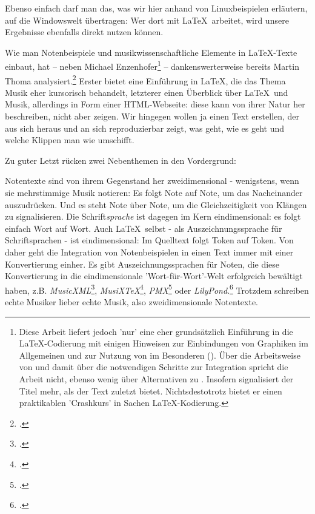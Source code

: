 Ebenso einfach darf man das, was wir hier anhand von Linuxbeispielen erläutern,
auf die Windowswelt übertragen: Wer dort mit \LaTeX\ arbeitet, wird unsere
Ergebnisse ebenfalls direkt nutzen können.

Wie man Notenbeispiele und musikwissenschaftliche Elemente in \LaTeX-Texte
einbaut, hat -- neben Michael Enzenhofer\footnote{Diese Arbeit liefert jedoch
'nur' eine eher grundsätzlich Einführung in die \LaTeX-Co\-die\-rung mit einigen
Hinweisen zur Einbindungen von Graphiken im Allgemeinen und zur Nutzung von
 im Besonderen (\cite[vgl. dazu][4ff, 31ff u.
21ff]{Enzenhofer2016a}). Über die Arbeitsweise von  und damit über
die notwendigen Schritte zur Integration spricht die Arbeit nicht, ebenso wenig
über Alternativen zu . Insofern signalisiert der Titel mehr, als
der Text zuletzt bietet. Nichtsdestotrotz bietet er einen praktikablen
'Crashkurs' in Sachen \LaTeX-Kodierung.} -- dankenswerterweise bereits Martin
Thoma analysiert.\footcite[vgl.][\nopage wp]{Thoma2018a} Erster bietet eine
Einführung in \LaTeX, die das Thema Musik eher kursorisch behandelt, letzterer
einen Überblick über \LaTeX\ und Musik, allerdings in Form einer HTML-Webseite:
diese kann von ihrer Natur her beschreiben, nicht aber zeigen. Wir hingegen
wollen ja einen Text erstellen, der aus sich heraus und an sich reproduzierbar
zeigt, was geht, wie es geht und welche Klippen man wie umschifft.

Zu guter Letzt rücken zwei Nebenthemen in den Vordergrund:

Notentexte sind von ihrem Gegenstand her zweidimensional - wenigstens, wenn sie
mehrstimmige Musik notieren: Es folgt Note auf Note, um das Nacheinander
auszudrücken. Und es steht Note über Note, um die Gleichzeitigkeit von Klängen
zu signalisieren. Die Schrift\textit{sprache} ist dagegen im Kern eindimensional:
es folgt einfach Wort auf Wort. Auch \LaTeX\ selbst - als Auszeichnungssprache
für Schriftsprachen - ist eindimensional: Im Quelltext folgt Token auf Token.
Von daher geht die Integration von Notenbeispielen in einen Text immer mit einer
Konvertierung einher. Es gibt Auszeichnungssprachen für Noten, die diese
Konvertierung in die eindimensionale 'Wort-für-Wort'-Welt erfolgreich bewältigt
haben, z.B. \textit{MusicXML}\footcite[vgl.][\nopage wp]{MusicXML2018a},
\textit{MusiX\TeX}\footcite[vgl.][\nopage wp]{CtanMusixTex2018a},
\textit{PMX}\footcite[vgl.][\nopage wp]{CtanPmx2018a} oder
\textit{LilyPond}.\footcite[vgl.][\nopage wp]{LilyPond2018a} Trotzdem schreiben
echte Musiker lieber echte Musik, also zweidimensionale Notentexte.


